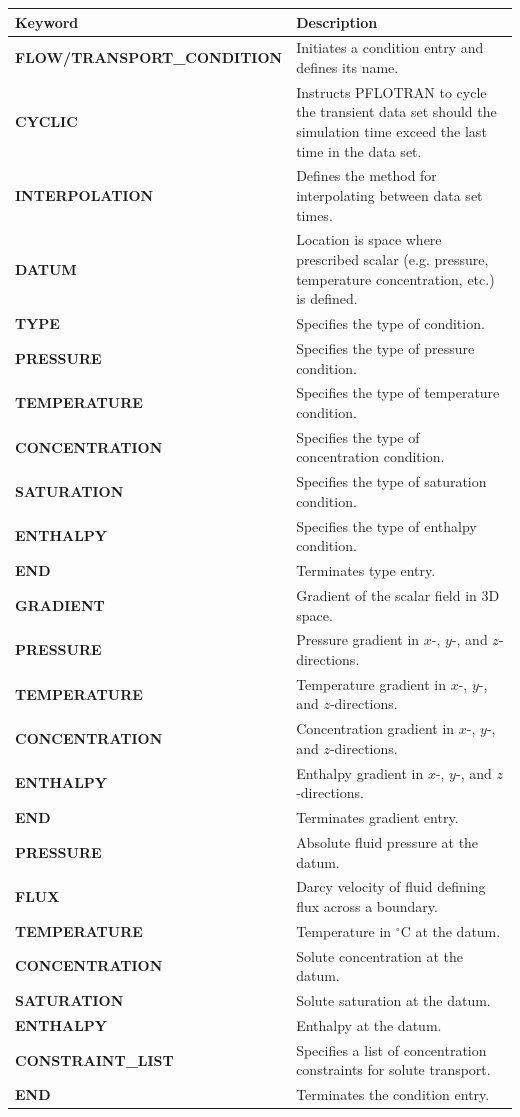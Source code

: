 \documentclass[12pt]{article}
\begin{document}
\begin{center}
\begin{tabularx}{\linewidth}{lX}
\toprule[1.5pt]
\bf Keyword & \bf Description\\
\midrule
\bf FLOW/TRANSPORT\_CONDITION & Initiates a condition entry and defines its name.\\
\midrule
\bf CYCLIC & Instructs PFLOTRAN to cycle the transient data set should the simulation time exceed the last time in the data set.\\
\midrule
\bf INTERPOLATION & Defines the method for interpolating between data set times.\\
\midrule
\bf DATUM & Location is space where prescribed scalar (e.g. pressure, temperature concentration, etc.) is defined.\\
\midrule
\bf TYPE & Specifies the type of condition.\\
\midrule
\bf PRESSURE & Specifies the type of pressure condition.\\
 \bf TEMPERATURE & Specifies the type of temperature condition.\\
    \bf CONCENTRATION & Specifies the type of concentration condition.\\
    \bf SATURATION & Specifies the type of saturation condition.\\
    \bf ENTHALPY & Specifies the type of enthalpy condition.\\
    \bf END & Terminates type entry.\\
\midrule\midrule
\bf GRADIENT & Gradient of the scalar field in 3D space.\\
\midrule
\bf PRESSURE & Pressure gradient in $x$-, $y$-, and $z$-directions.\\
\bf TEMPERATURE & Temperature gradient in $x$-, $y$-, and $z$-directions.\\
\bf CONCENTRATION & Concentration gradient in $x$-, $y$-, and $z$-directions.\\
\bf ENTHALPY & Enthalpy gradient in $x$-, $y$-, and $z$-directions.\\
\bf END & Terminates gradient entry.\\
\midrule\midrule
\bf PRESSURE & Absolute fluid pressure at the datum.\\
\bf FLUX & Darcy velocity of fluid defining flux across a boundary.\\
\bf TEMPERATURE & Temperature in $^\circ$C at the datum.\\
\bf CONCENTRATION & Solute concentration at the datum.\\
\bf SATURATION & Solute saturation at the datum.\\
\bf ENTHALPY & Enthalpy at the datum.\\
\bf CONSTRAINT\_LIST & Specifies a list of concentration constraints for solute transport.\\
\bf END & Terminates the condition entry.\\
\bottomrule[1.5pt]
\end{tabularx}
\end{center}
\end{document}
